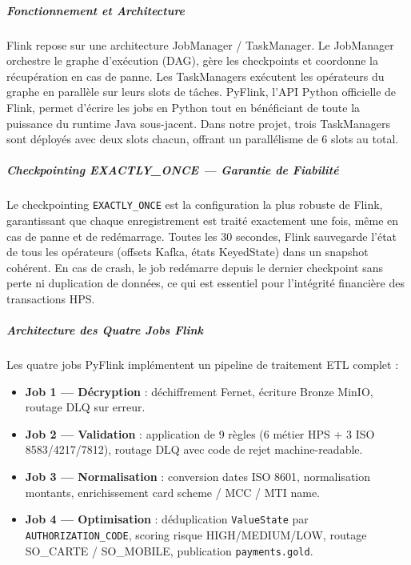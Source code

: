 \vspace{0.3cm}
\subparagraph{Fonctionnement et Architecture}
\vspace{0.1cm}
Flink repose sur une architecture JobManager / TaskManager. Le JobManager orchestre le graphe d'exécution (DAG), gère les checkpoints et coordonne la récupération en cas de panne. Les TaskManagers exécutent les opérateurs du graphe en parallèle sur leurs slots de tâches. PyFlink, l'API Python officielle de Flink, permet d'écrire les jobs en Python tout en bénéficiant de toute la puissance du runtime Java sous-jacent. Dans notre projet, trois TaskManagers sont déployés avec deux slots chacun, offrant un parallélisme de 6 slots au total.

\vspace{0.3cm}
\subparagraph{Checkpointing EXACTLY\_ONCE --- Garantie de Fiabilité}
\vspace{0.1cm}
Le checkpointing \texttt{EXACTLY\_ONCE} est la configuration la plus robuste de Flink, garantissant que chaque enregistrement est traité exactement une fois, même en cas de panne et de redémarrage. Toutes les 30 secondes, Flink sauvegarde l'état de tous les opérateurs (offsets Kafka, états KeyedState) dans un snapshot cohérent. En cas de crash, le job redémarre depuis le dernier checkpoint sans perte ni duplication de données, ce qui est essentiel pour l'intégrité financière des transactions HPS.

\vspace{0.3cm}
\subparagraph{Architecture des Quatre Jobs Flink}
\vspace{0.1cm}
Les quatre jobs PyFlink implémentent un pipeline de traitement ETL complet :

\begin{itemize}
    \item \textbf{Job 1 --- Décryption} : déchiffrement Fernet, écriture Bronze MinIO, routage DLQ sur erreur.
    \item \textbf{Job 2 --- Validation} : application de 9 règles (6 métier HPS + 3 ISO 8583/4217/7812), routage DLQ avec code de rejet machine-readable.
    \item \textbf{Job 3 --- Normalisation} : conversion dates ISO 8601, normalisation montants, enrichissement card scheme / MCC / MTI name.
    \item \textbf{Job 4 --- Optimisation} : déduplication \texttt{ValueState} par \texttt{AUTHORIZATION\_CODE}, scoring risque HIGH/MEDIUM/LOW, routage SO\_CARTE / SO\_MOBILE, publication \texttt{payments.gold}.
\end{itemize}

